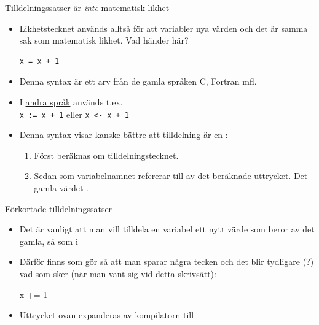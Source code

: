 \documentclass{simpleslides}
\begin{document}
\begin{Slide}{Tilldelningssatser är \emph{inte} matematisk likhet}\SlideFontSmall

\begin{itemize}

\item Likhetstecknet används alltså för att  variabler nya värden och det är  samma sak som matematisk likhet. Vad händer här?
\begin{lstlisting}
x = x + 1
\end{lstlisting}

\item Denna syntax är ett arv från de gamla språken C, Fortran mfl.

\item I \href{https://en.wikipedia.org/wiki/Assignment_(computer_science)}{andra språk} används  t.ex.  \\\vspace{1em}
\texttt{x := x + 1}  \hspace{2em} eller  \hspace{2em} \texttt{x <- x + 1} \\\vspace{0.5em}

\item Denna syntax visar kanske bättre att tilldelning är en :

\begin{enumerate}\SlideFontTiny
\item Först beräknas  om tilldelningstecknet.
\item Sedan  som variabelnamnet refererar till av det beräknade uttrycket. Det gamla värdet .
\end{enumerate}

\end{itemize}

\end{Slide}
    
    
\begin{Slide}{Förkortade tilldelningssatser}
\begin{itemize}
\item Det är vanligt att man vill tilldela en variabel ett nytt värde som beror av det gamla, så som i \\

\item Därför finns  som gör så att man sparar några tecken och det blir tydligare (?) vad som sker (när man vant sig vid detta skrivsätt):
\begin{Code}
x += 1
\end{Code}

\item Uttrycket ovan expanderas av kompilatorn till 
\end{itemize}


\end{Slide}
    
\end{document}
